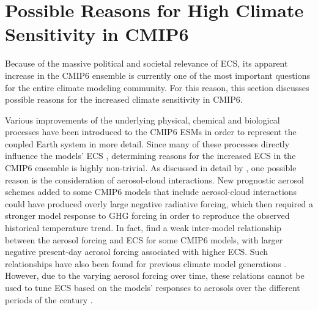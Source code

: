 \section{Possible Reasons for High Climate Sensitivity in \acs{CMIP}6}
\label{sec:04:possible_reasons_high_ecs_cmip6}

Because of the massive political and societal relevance of \ac{ECS}, its
apparent increase in the \ac{CMIP}6 ensemble is currently one of the most
important questions for the entire climate modeling community. For this reason,
this section discusses possible reasons for the increased climate sensitivity
in \acs{CMIP}6.

Various improvements of the underlying physical, chemical and biological
processes have been introduced to the \acs{CMIP}6 \acp{ESM} in order to
represent the coupled Earth system in more detail. Since many of these
processes directly influence the models' \ac{ECS} \autocite{Forster2020},
determining reasons for the increased \ac{ECS} in the \acs{CMIP}6 ensemble is
highly non-trivial. As discussed in detail by \textcite{Meehl2020}, one
possible reason is the consideration of aerosol-cloud interactions. New
prognostic aerosol schemes added to some \acs{CMIP}6 models that include
aerosol-cloud interactions could have produced overly large negative radiative
forcing, which then required a stronger model response to \ac{GHG} forcing in
order to reproduce the observed historical temperature trend. In fact,
\textcite{Meehl2020} find a weak inter-model relationship between the aerosol
forcing and \ac{ECS} for some \acs{CMIP}6 models, with larger negative
present-day aerosol forcing associated with higher \ac{ECS}. Such relationships
have also been found for previous climate model generations
\autocite{Kiehl2007, Forster2013}. However, due to the varying aerosol forcing
over time, these relations cannot be used to tune \ac{ECS} based on the models'
responses to aerosols over the different periods of the  century
\autocite{Dittus2020}.

